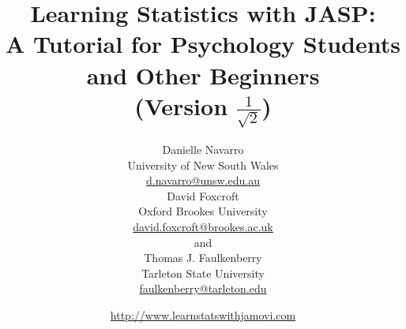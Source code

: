 


\date{\url{http://www.learnstatswithjamovi.com} \hfill \\ }
\title{Learning Statistics with JASP:\\ A Tutorial for Psychology Students and Other Beginners \vspace*{12pt}
\\ (Version $\displaystyle{\frac{1}{\sqrt{2}}}$) \\ \vspace*{24pt}}
\author{Danielle Navarro \\ University of New South Wales \\ \url{d.navarro@unsw.edu.au} \vspace*{12pt} \\
David Foxcroft \\ Oxford Brookes University \\ \url{david.foxcroft@brookes.ac.uk} \vspace*{12pt} \\
and \vspace*{12pt} \\
Thomas J. Faulkenberry \\ Tarleton State University \\ \url{faulkenberry@tarleton.edu}\vspace*{36pt}}


 